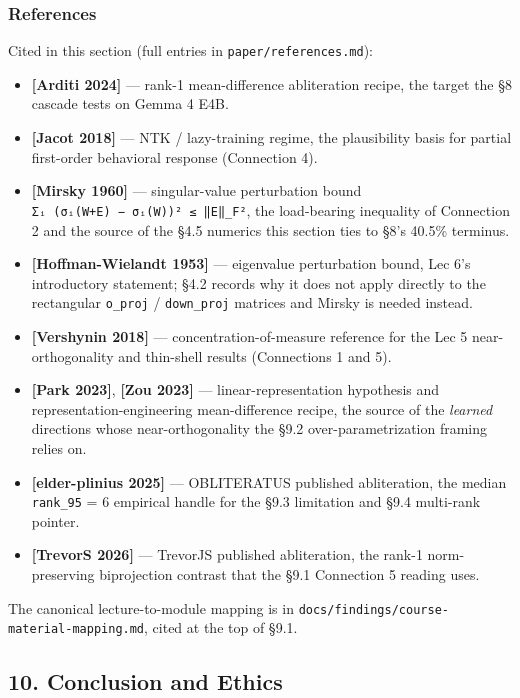 \documentclass[
  11pt,
]{article}
\providecommand{\tightlist}{%
  \setlength{\itemsep}{0pt}\setlength{\parskip}{0pt}}
\begin{document}
\subsubsection{References}\label{references-2}

Cited in this section (full entries in \texttt{paper/references.md}):

\begin{itemize}
\tightlist
\item
  \textbf{{[}Arditi 2024{]}} --- rank-1 mean-difference abliteration
  recipe, the target the §8 cascade tests on Gemma 4 E4B.
\item
  \textbf{{[}Jacot 2018{]}} --- NTK / lazy-training regime, the
  plausibility basis for partial first-order behavioral response
  (Connection 4).
\item
  \textbf{{[}Mirsky 1960{]}} --- singular-value perturbation bound
  \texttt{Σᵢ\ (σᵢ(W+E)\ −\ σᵢ(W))²\ ≤\ ‖E‖\_F²}, the load-bearing
  inequality of Connection 2 and the source of the §4.5 numerics this
  section ties to §8's 40.5\% terminus.
\item
  \textbf{{[}Hoffman-Wielandt 1953{]}} --- eigenvalue perturbation
  bound, Lec 6's introductory statement; §4.2 records why it does not
  apply directly to the rectangular \texttt{o\_proj} /
  \texttt{down\_proj} matrices and Mirsky is needed instead.
\item
  \textbf{{[}Vershynin 2018{]}} --- concentration-of-measure reference
  for the Lec 5 near-orthogonality and thin-shell results (Connections 1
  and 5).
\item
  \textbf{{[}Park 2023{]}}, \textbf{{[}Zou 2023{]}} ---
  linear-representation hypothesis and representation-engineering
  mean-difference recipe, the source of the \emph{learned} directions
  whose near-orthogonality the §9.2 over-parametrization framing relies
  on.
\item
  \textbf{{[}elder-plinius 2025{]}} --- OBLITERATUS published
  abliteration, the median \texttt{rank\_95} = 6 empirical handle for
  the §9.3 limitation and §9.4 multi-rank pointer.
\item
  \textbf{{[}TrevorS 2026{]}} --- TrevorJS published abliteration, the
  rank-1 norm-preserving biprojection contrast that the §9.1 Connection
  5 reading uses.
\end{itemize}

The canonical lecture-to-module mapping is in
\texttt{docs/findings/course-material-mapping.md}, cited at the top of
§9.1.

\subsection{10. Conclusion and Ethics}\label{conclusion-and-ethics}
\end{document}
